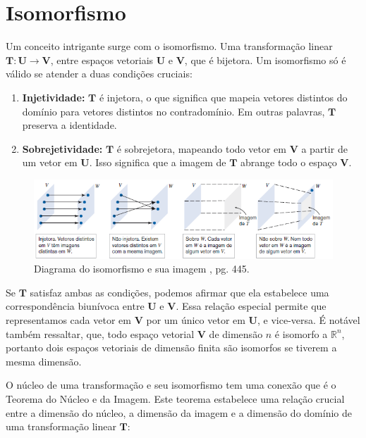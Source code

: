 \section{Isomorfismo}
Um conceito intrigante surge com o isomorfismo. Uma transformação linear $\mathbf{T}: \mathbf{U} \longrightarrow \mathbf{V}$, entre espaços vetoriais $\mathbf{U}$ e $\mathbf{V}$, que é bijetora. Um isomorfismo só é válido se atender a duas condições cruciais:

\begin{enumerate}
	\item \textbf{Injetividade:} $\mathbf{T}$ é injetora, o que significa que mapeia vetores distintos do domínio para vetores distintos no contradomínio. Em outras palavras, $\mathbf{T}$ preserva a identidade.
	\item \textbf{Sobrejetividade:} $\mathbf{T}$ é sobrejetora, mapeando todo vetor em $\mathbf{V}$ a partir de um vetor em $\mathbf{U}$. Isso significa que a imagem de $\mathbf{T}$ abrange todo o espaço $\mathbf{V}$.
\end{enumerate}

\begin{figure}[H]
	\centering
	\includegraphics[scale=0.90]{t_isomorfismo.png}
	\caption{Diagrama do isomorfismo e sua imagem \cite{anton2010elementary}, pg. 445.}
\end{figure}

Se $\mathbf{T}$ satisfaz ambas as condições, podemos afirmar que ela estabelece uma correspondência biunívoca entre $\mathbf{U}$ e $\mathbf{V}$. Essa relação especial permite que representamos cada vetor em $\mathbf{V}$  por um único vetor em $\mathbf{U}$, e vice-versa. É notável também ressaltar, que, todo espaço vetorial $\mathbf{V}$ de dimensão $n$ é isomorfo a $\mathbb{R}^n$, portanto dois espaços vetoriais de dimensão finita são isomorfos se tiverem a mesma dimensão.

O núcleo de uma transformação e seu isomorfismo tem uma conexão que é o Teorema do Núcleo e da Imagem. Este teorema estabelece uma relação crucial entre a dimensão do núcleo, a dimensão da imagem e a dimensão do domínio de uma transformação linear $\mathbf{T}$:

